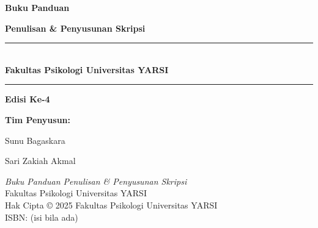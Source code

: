 

\cleardoublepage

\begin{titlepage}
\centering
\vspace*{2.5cm}
{\fontsize{22pt}{26pt}\selectfont\bfseries Buku Panduan\\[2mm]}
{\fontsize{22pt}{26pt}\selectfont\bfseries Penulisan \& Penyusunan Skripsi\par}

\vspace{1.2cm}
\rule{\linewidth}{0.5pt}\\[-6pt]
{\large \textbf{Fakultas Psikologi Universitas YARSI}}\par
\rule{\linewidth}{0.5pt}

\vspace{1.4cm}
{\large \textbf{Edisi Ke-4}\par}

\vfill
{\large \textbf{Tim Penyusun:}}\par
{\large Sunu Bagaskara\par}
{\large Sari Zakiah Akmal\par}
\vspace*{1.2cm}
\end{titlepage}
\cleardoublepage

\thispagestyle{empty}
\vspace*{\fill}
\begin{center}
\textit{Buku Panduan Penulisan \& Penyusunan Skripsi}\\
Fakultas Psikologi Universitas YARSI\\[6pt]
Hak Cipta © 2025 Fakultas Psikologi Universitas YARSI\\
ISBN: (isi bila ada)
\end{center}
\vspace*{\fill}
\clearpage